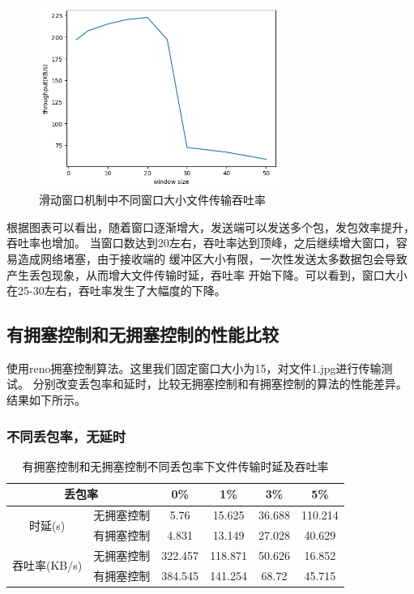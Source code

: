 \documentclass[a4paper]{article}
\begin{document}
\begin{figure}[H]
  \centering
  \includegraphics[width=0.7\textwidth]{f1.jpg}
  \caption{滑动窗口机制中不同窗口大小文件传输吞吐率}
  \label{fig:2}
\end{figure}

根据图表可以看出，随着窗口逐渐增大，发送端可以发送多个包，发包效率提升，吞吐率也增加。
当窗口数达到20左右，吞吐率达到顶峰，之后继续增大窗口，容易造成网络堵塞，由于接收端的
缓冲区大小有限，一次性发送太多数据包会导致产生丢包现象，从而增大文件传输时延，吞吐率
开始下降。可以看到，窗口大小在25-30左右，吞吐率发生了大幅度的下降。

\subsection{有拥塞控制和无拥塞控制的性能比较}

使用reno拥塞控制算法。这里我们固定窗口大小为15，对文件1.jpg进行传输测试。
分别改变丢包率和延时，比较无拥塞控制和有拥塞控制的算法的性能差异。结果如下所示。

\subsubsection{不同丢包率，无延时}

\begin{table}[!htbp]
\centering
\begin{tabular}{|cc|c|c|c|c|}
\hline
\multicolumn{2}{|c|}{丢包率} & 0\% & 1\% & 3\% & 5\% \\ \hline
\multicolumn{1}{|c|}{\multirow{2}{*}{时延(s)}} & 无拥塞控制 & 5.76 & 15.625 & 36.688 & 110.214 \\ \cline{2-6} 
\multicolumn{1}{|c|}{} & 有拥塞控制 & 4.831 & 13.149 & 27.028 & 40.629 \\ \hline
\multicolumn{1}{|c|}{\multirow{2}{*}{吞吐率(KB/s)}} & 无拥塞控制 & 322.457 & 118.871 & 50.626 & 16.852 \\ \cline{2-6} 
\multicolumn{1}{|c|}{} & 有拥塞控制 & 384.545 & 141.254 & 68.72 & 45.715 \\ \hline
\end{tabular}
\caption{有拥塞控制和无拥塞控制不同丢包率下文件传输时延及吞吐率}
\label{table:4}
\end{table}
\end{document}
